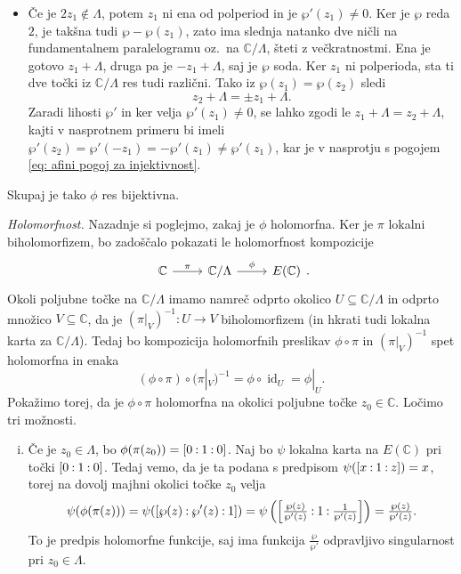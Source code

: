 \documentclass[mat1]{fmfdelo}
\numberwithin{equation}{section}
\newcommand{\C}{\mathbb C}
\newcommand{\oio}{\pcoor{0: 1 : 0}}
\newcommand{\inv}{^{-1}}
\newcommand{\torus}{\C/\Lambda}
\newcommand{\pcoor}[1]{%
\begingroup\lccode`~=`: \lowercase{\endgroup
\edef~}{\mathbin{\mathchar\the\mathcode`:}\nobreak}%
\left[%
\begingroup
\mathcode`:=\string"8000
#1%
\endgroup
\right]%
}
\newcommand{\oz}{oz.\ }
\DeclareMathOperator{\id}{id}
\theoremstyle{definition}
\begin{document}
\begin{dokaz}
\begin{itemize}
        \item 
        Če je $2z_1 \not\in \Lambda$, potem $z_1$ ni ena od polperiod in je $\wp'(z_1) \neq 0$. Ker je $\wp$ reda $2$, je takšna tudi $\wp - \wp(z_1)$, zato ima slednja natanko dve ničli na fundamentalnem paralelogramu \oz na $\torus$, šteti z večkratnostmi. Ena je gotovo $z_1 + \Lambda$, druga pa je $-z_1 + \Lambda$, saj je $\wp$ soda. Ker $z_1$ ni polperioda, sta ti dve točki iz $\torus$ res tudi različni. Tako iz $\wp(z_1) = \wp(z_2)$ sledi
        \[
            z_2 + \Lambda = \pm z_1 + \Lambda.
        \]
        Zaradi lihosti $\wp'$ in ker velja $\wp'(z_1) \neq 0$, se lahko zgodi le $z_1 + \Lambda = z_2 + \Lambda$, kajti v nasprotnem primeru bi imeli $\wp'(z_2) = \wp'(-z_1) = -\wp'(z_1) \neq \wp'(z_1)$, kar je v nasprotju s pogojem \eqref{eq: afini pogoj za injektivnost}.
    \end{itemize}
    Skupaj je tako $\phi$ res bijektivna. 

    \emph{Holomorfnost.}
    Nazadnje si poglejmo, zakaj je $\phi$ holomorfna. Ker je $\pi$ lokalni biholomorfizem, bo zadoščalo pokazati le holomorfnost kompozicije 
    \[\begin{tikzcd}
	    \C & \torus & E(\C)
	    \arrow["\pi", from=1-1, to=1-2]
	    \arrow["\phi", from=1-2, to=1-3]
    \end{tikzcd}.\]
    Okoli poljubne točke na $\torus$ imamo namreč odprto okolico $U\subseteq \torus$ in odprto množico $V\subseteq \C$, da je $(\pi|_V)\inv : U \to V$ biholomorfizem (in hkrati tudi lokalna karta za $\torus$). Tedaj bo kompozicija holomorfnih preslikav $\phi\circ \pi$ in $(\pi|_V)\inv$ spet holomorfna in enaka
    \[
        (\phi \circ \pi) \circ (\pi|_V)\inv = \phi \circ \id_U = \phi|_U.  
    \]
    Pokažimo torej, da je $\phi\circ\pi$ holomorfna na okolici poljubne točke $z_0 \in \C$. Ločimo tri možnosti.
    \begin{enumerate}[(i)]
        \item 
        Če je $z_0 \in \Lambda$, bo $\phi(\pi(z_0)) = \oio$. Naj bo $\psi$ lokalna karta na $E(\C)$ pri točki $\oio$. Tedaj vemo, da je ta podana s predpisom $\psi(\pcoor{x : 1 : z}) = x$, torej na dovolj majhni okolici točke $z_0$ velja 
        \[
            \psi(\phi(\pi(z))) = \psi(\pcoor{\wp(z) : \wp'(z) : 1}) = 
            \psi\left(\pcoor{\tfrac{\wp(z)}{\wp'(z)} : 1 : \tfrac{1}{\wp'(z)}}\right) = \tfrac{\wp(z)}{\wp'(z)}.
        \]
        To je predpis holomorfne funkcije, saj ima funkcija $\frac{\wp}{\wp'}$ odpravljivo singularnost pri $z_0 \in \Lambda$.


\end{enumerate}
\end{dokaz}
\end{document}
